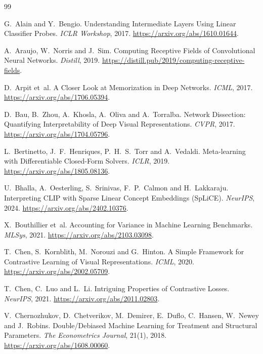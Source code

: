\documentclass[11pt]{article}
\begin{document}
\begingroup
\small
\setlength{\bibsep}{3pt plus 1pt}
\begin{thebibliography}{99}

G.~Alain and Y.~Bengio. Understanding Intermediate Layers Using Linear Classifier Probes. \emph{ICLR Workshop}, 2017.
\url{https://arxiv.org/abs/1610.01644}.

A.~Araujo, W.~Norris and J.~Sim. Computing Receptive Fields of Convolutional Neural Networks. \emph{Distill}, 2019.
\url{https://distill.pub/2019/computing-receptive-fields}.

D.~Arpit et~al. A Closer Look at Memorization in Deep Networks. \emph{ICML}, 2017.
\url{https://arxiv.org/abs/1706.05394}.

D.~Bau, B.~Zhou, A.~Khosla, A.~Oliva and A.~Torralba. Network Dissection: Quantifying Interpretability of Deep Visual
Representations. \emph{CVPR}, 2017. \url{https://arxiv.org/abs/1704.05796}.

L.~Bertinetto, J.~F.~Henriques, P.~H.~S.~Torr and A.~Vedaldi. Meta-learning with Differentiable Closed-Form Solvers.
\emph{ICLR}, 2019. \url{https://arxiv.org/abs/1805.08136}.

U.~Bhalla, A.~Oesterling, S.~Srinivas, F.~P.~Calmon and H.~Lakkaraju. Interpreting CLIP with Sparse Linear Concept
Embeddings (SpLiCE). \emph{NeurIPS}, 2024. \url{https://arxiv.org/abs/2402.10376}.

X.~Bouthillier et~al. Accounting for Variance in Machine Learning Benchmarks. \emph{MLSys}, 2021.
\url{https://arxiv.org/abs/2103.03098}.

T.~Chen, S.~Kornblith, M.~Norouzi and G.~Hinton. A Simple Framework for Contrastive Learning of Visual Representations.
\emph{ICML}, 2020. \url{https://arxiv.org/abs/2002.05709}.

T.~Chen, C.~Luo and L.~Li. Intriguing Properties of Contrastive Losses. \emph{NeurIPS}, 2021.
\url{https://arxiv.org/abs/2011.02803}.

V.~Chernozhukov, D.~Chetverikov, M.~Demirer, E.~Duflo, C.~Hansen, W.~Newey and J.~Robins. Double/Debiased Machine
Learning for Treatment and Structural Parameters. \emph{The Econometrics Journal}, 21(1), 2018.
\url{https://arxiv.org/abs/1608.00060}.


\end{thebibliography}
\end{document}

